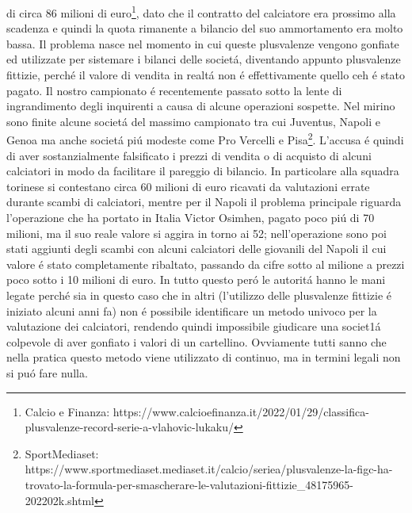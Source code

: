 \documentclass[
    corpo=12pt,
    oneside,
    evenboxes,
    tipotesi=triennale,
    stile=classica,
    oldstyle,
    autoretitolo,
    greek,
]{toptesi}
\begin{document}
\begin{interlinea}{1.5}
di circa 86 milioni di euro\footnote{Calcio e Finanza: https://www.calcioefinanza.it/2022/01/29/classifica-plusvalenze-record-serie-a-vlahovic-lukaku/}, 
dato che il contratto del calciatore era prossimo alla scadenza e quindi la quota rimanente a bilancio del suo ammortamento era molto bassa. 
Il problema nasce nel momento in cui queste plusvalenze vengono gonfiate ed utilizzate per sistemare i bilanci delle societ\'a, diventando 
appunto plusvalenze fittizie, perch\'e il valore di vendita in realt\'a non \'e effettivamente quello ceh \'e stato pagato. Il nostro campionato
\'e recentemente passato sotto la lente di ingrandimento degli inquirenti a causa di alcune operazioni sospette. Nel mirino sono finite alcune societ\'a
del massimo campionato tra cui Juventus, Napoli e Genoa ma anche societ\'a pi\'u modeste come Pro Vercelli e Pisa\footnote{SportMediaset: https://www.sportmediaset.mediaset.it/calcio/seriea/plusvalenze-la-figc-ha-trovato-la-formula-per-smascherare-le-valutazioni-fittizie\_48175965-202202k.shtml}. L'accusa \'e quindi di 
aver sostanzialmente falsificato i prezzi di vendita o di acquisto di alcuni calciatori in modo da facilitare il pareggio di bilancio.
In particolare alla squadra torinese si contestano circa 60 milioni di euro ricavati da valutazioni errate durante scambi di calciatori, mentre per 
il Napoli il problema principale riguarda l'operazione che ha portato in Italia Victor Osimhen, pagato poco pi\'u di 70 milioni, ma il suo reale 
valore si aggira in torno ai 52; nell'operazione sono poi stati aggiunti degli scambi con alcuni calciatori delle giovanili del Napoli il cui
valore \'e stato completamente ribaltato, passando da cifre sotto al milione a prezzi poco sotto i 10 milioni di euro. In tutto questo per\'o
le autorit\'a hanno le mani legate perch\'e sia in questo caso che in altri (l'utilizzo delle plusvalenze fittizie \'e iniziato alcuni anni fa)
non \'e possibile identificare un metodo univoco per la valutazione dei calciatori, rendendo quindi impossibile giudicare una societ1\'a
colpevole di aver gonfiato i valori di un cartellino. Ovviamente tutti sanno che nella pratica questo metodo viene utilizzato di continuo,
ma in termini legali non si pu\'o fare nulla.\newline

\end{interlinea}
\end{document}
